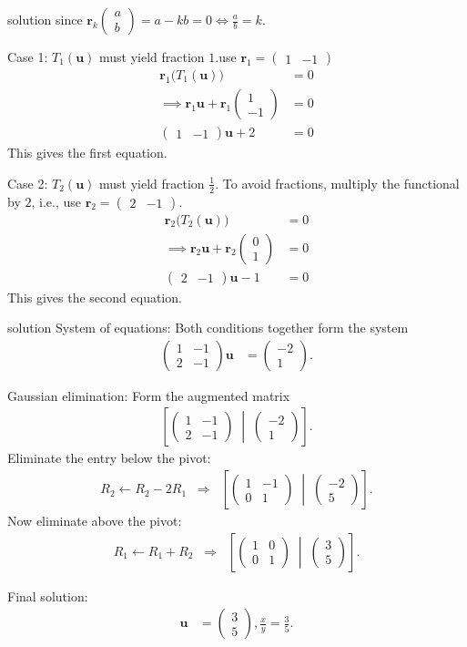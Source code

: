 \documentclass{beamer}
\numberwithin{equation}{section}
\theoremstyle{remark}
\newcommand{\myvec}[1]{\ensuremath{\begin{pmatrix}#1\end{pmatrix}}}
\let\vec\mathbf
\begin{document}
\begin{frame}{solution}
since $\vec{r}_k \myvec{a \\ b} = a - kb = 0 \iff \tfrac{a}{b}=k$.



Case 1: $T_1(\vec{u})$ must yield fraction $1$.use $\vec{r}_1 = \myvec{1 & -1}$
\begin{align}
\vec{r}_1 \big(T_1(\vec{u})\big) &= 0 \\
\implies \vec{r}_1\vec{u} + \vec{r}_1\myvec{1 \\ -1} &= 0 \\
\myvec{1 & -1}\vec{u} + 2 &= 0 
\end{align}
This gives the first equation.



Case 2: $T_2(\vec{u})$ must yield fraction $\tfrac{1}{2}$.  
To avoid fractions, multiply the functional by $2$, i.e., use $\vec{r}_2 = \myvec{2 & -1}$.
\begin{align}
\vec{r}_2 \big(T_2(\vec{u})\big) &= 0 \\
\implies \vec{r}_2\vec{u} + \vec{r}_2\myvec{0 \\ 1} &= 0 \\
\myvec{2 & -1}\vec{u} - 1 &= 0 
\end{align}
This gives the second equation.

\end{frame}
\begin{frame}{solution}
System of equations:  
Both conditions together form the system
\begin{align}
\myvec{1 & -1 \\ 2 & -1}\vec{u} &= \myvec{-2 \\ 1}.
\end{align}



Gaussian elimination:  
Form the augmented matrix
\begin{align}
\left[\myvec{1 & -1 \\ 2 & -1} \;\middle|\; \myvec{-2 \\ 1}\right].
\end{align}
Eliminate the entry below the pivot:
\begin{align}
R_2 \leftarrow R_2 - 2R_1 \;\;\Rightarrow\;\;
\left[\myvec{1 & -1 \\ 0 & 1} \;\middle|\; \myvec{-2 \\ 5}\right].
\end{align}
Now eliminate above the pivot:
\begin{align}
R_1 \leftarrow R_1 + R_2 \;\;\Rightarrow\;\;
\left[\myvec{1 & 0 \\ 0 & 1} \;\middle|\; \myvec{3 \\ 5}\right].
\end{align}



Final solution:
\begin{align}
\vec{u} &= \myvec{3 \\ 5}, 
\frac{x}{y} = \frac{3}{5}.
\end{align}
\end{frame}
\end{document}
